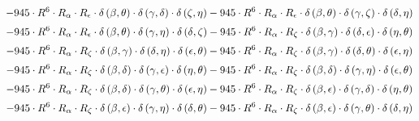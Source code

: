 \begin{subequations}
\begin{gather}
 \\[0.2em] \notag 		 - 945 \cdot R^{6} \cdot R_{\alpha{}} \cdot R_{\epsilon{}} \cdot \delta{}\left(\beta{}, \theta{}\right) \cdot \delta{}\left(\gamma{}, \delta{}\right) \cdot \delta{}\left(\zeta{}, \eta{}\right)- 945 \cdot R^{6} \cdot R_{\alpha{}} \cdot R_{\epsilon{}} \cdot \delta{}\left(\beta{}, \theta{}\right) \cdot \delta{}\left(\gamma{}, \zeta{}\right) \cdot \delta{}\left(\delta{}, \eta{}\right) 
 \\[0.2em] \notag 		 - 945 \cdot R^{6} \cdot R_{\alpha{}} \cdot R_{\epsilon{}} \cdot \delta{}\left(\beta{}, \theta{}\right) \cdot \delta{}\left(\gamma{}, \eta{}\right) \cdot \delta{}\left(\delta{}, \zeta{}\right)- 945 \cdot R^{6} \cdot R_{\alpha{}} \cdot R_{\zeta{}} \cdot \delta{}\left(\beta{}, \gamma{}\right) \cdot \delta{}\left(\delta{}, \epsilon{}\right) \cdot \delta{}\left(\eta{}, \theta{}\right) 
 \\[0.2em] \notag 		 - 945 \cdot R^{6} \cdot R_{\alpha{}} \cdot R_{\zeta{}} \cdot \delta{}\left(\beta{}, \gamma{}\right) \cdot \delta{}\left(\delta{}, \eta{}\right) \cdot \delta{}\left(\epsilon{}, \theta{}\right)- 945 \cdot R^{6} \cdot R_{\alpha{}} \cdot R_{\zeta{}} \cdot \delta{}\left(\beta{}, \gamma{}\right) \cdot \delta{}\left(\delta{}, \theta{}\right) \cdot \delta{}\left(\epsilon{}, \eta{}\right) 
 \\[0.2em] \notag 		 - 945 \cdot R^{6} \cdot R_{\alpha{}} \cdot R_{\zeta{}} \cdot \delta{}\left(\beta{}, \delta{}\right) \cdot \delta{}\left(\gamma{}, \epsilon{}\right) \cdot \delta{}\left(\eta{}, \theta{}\right)- 945 \cdot R^{6} \cdot R_{\alpha{}} \cdot R_{\zeta{}} \cdot \delta{}\left(\beta{}, \delta{}\right) \cdot \delta{}\left(\gamma{}, \eta{}\right) \cdot \delta{}\left(\epsilon{}, \theta{}\right) 
 \\[0.2em] \notag 		 - 945 \cdot R^{6} \cdot R_{\alpha{}} \cdot R_{\zeta{}} \cdot \delta{}\left(\beta{}, \delta{}\right) \cdot \delta{}\left(\gamma{}, \theta{}\right) \cdot \delta{}\left(\epsilon{}, \eta{}\right)- 945 \cdot R^{6} \cdot R_{\alpha{}} \cdot R_{\zeta{}} \cdot \delta{}\left(\beta{}, \epsilon{}\right) \cdot \delta{}\left(\gamma{}, \delta{}\right) \cdot \delta{}\left(\eta{}, \theta{}\right) 
 \\[0.2em] \notag 		 - 945 \cdot R^{6} \cdot R_{\alpha{}} \cdot R_{\zeta{}} \cdot \delta{}\left(\beta{}, \epsilon{}\right) \cdot \delta{}\left(\gamma{}, \eta{}\right) \cdot \delta{}\left(\delta{}, \theta{}\right)- 945 \cdot R^{6} \cdot R_{\alpha{}} \cdot R_{\zeta{}} \cdot \delta{}\left(\beta{}, \epsilon{}\right) \cdot \delta{}\left(\gamma{}, \theta{}\right) \cdot \delta{}\left(\delta{}, \eta{}\right) 

\end{gather}
\end{subequations}
